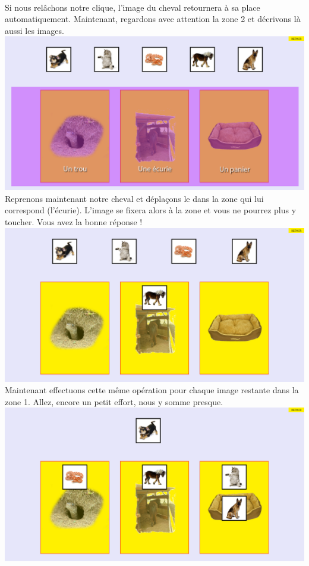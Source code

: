 \documentclass{article}
\begin{document}
\vspace{0.5cm}\\
Si nous rel\^achons notre clique, l'image du cheval retournera \`a sa place automatiquement. Maintenant, regardons avec attention la zone 2 et d\'ecrivons l\`a aussi les images. 
\vspace{0.5cm}\\
\includegraphics[width=1.0\textwidth]{zone3}
\vspace{0.5cm}\\
Reprenons maintenant notre cheval et d\'epla\c{c}ons le dans la zone qui lui correspond (l'\'ecurie). L'image se fixera alors \`a la zone et vous ne pourrez plus y toucher. Vous avez la bonne r\'eponse !
\vspace{0.5cm}\\
\includegraphics[width=1.0\textwidth]{zone4}
\vspace{0.5cm}\\
Maintenant effectuons cette m\^eme op\'eration pour chaque image restante dans la zone 1. Allez, encore un petit effort, nous y somme presque.
\vspace{0.5cm}\\
\includegraphics[width=1.0\textwidth]{zone5}
\end{document}
